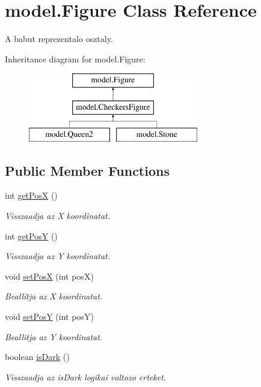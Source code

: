 \hypertarget{classmodel_1_1_figure}{}\section{model.\+Figure Class Reference}
\label{classmodel_1_1_figure}


A babut reprezentalo osztaly.  


Inheritance diagram for model.\+Figure\+:\begin{figure}[H]
\begin{center}
\leavevmode
\includegraphics[height=3.000000cm]{classmodel_1_1_figure}
\end{center}
\end{figure}
\subsection*{Public Member Functions}
\begin{DoxyCompactItemize}
\item 
int \hyperlink{classmodel_1_1_figure_a358304accea622125647500452eeb17a}{get\+Pos\+X} ()
\begin{DoxyCompactList}\small\item\em Visszaadja az X koordinatat. \end{DoxyCompactList}\item 
int \hyperlink{classmodel_1_1_figure_aa777f7294810c1fb0f6d3bdb47ba6ae9}{get\+Pos\+Y} ()
\begin{DoxyCompactList}\small\item\em Visszaadja az Y koordinatat. \end{DoxyCompactList}\item 
void \hyperlink{classmodel_1_1_figure_a28566262a5ad1e7411900b167b0e9c7d}{set\+Pos\+X} (int pos\+X)
\begin{DoxyCompactList}\small\item\em Beallitja az X koordinatat. \end{DoxyCompactList}\item 
void \hyperlink{classmodel_1_1_figure_a2172418b68198d637829a8803b26ec5d}{set\+Pos\+Y} (int pos\+Y)
\begin{DoxyCompactList}\small\item\em Beallitja az Y koordinatat. \end{DoxyCompactList}\item 
boolean \hyperlink{classmodel_1_1_figure_ae0bb1f1d02bda635222b0b58a32eca53}{is\+Dark} ()
\begin{DoxyCompactList}\small\item\em Visszaadja az is\+Dark logikai valtozo erteket. \end{DoxyCompactList}\end{DoxyCompactItemize}


